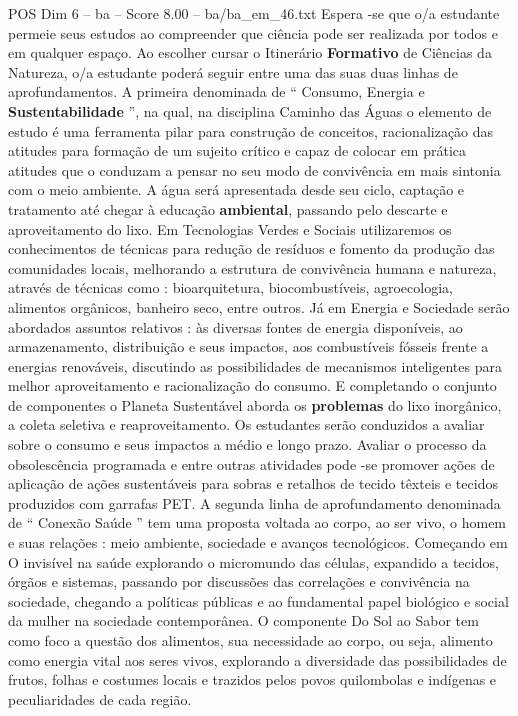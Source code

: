 \begin{textsample}{POS Dim 6 – ba – Score 8.00 – ba/ba\_em\_46.txt}
Espera -se que o/a estudante permeie seus estudos ao compreender que ciência pode ser realizada por todos e em qualquer espaço.
Ao escolher cursar o Itinerário \textbf{Formativo} de Ciências da Natureza, o/a estudante poderá seguir entre uma das suas duas linhas de aprofundamentos.
A primeira denominada de “ Consumo, Energia e \textbf{Sustentabilidade} ”, na qual, na disciplina Caminho das Águas o elemento de estudo é uma ferramenta pilar para construção de conceitos, racionalização das atitudes para formação de um sujeito crítico e capaz de colocar em prática atitudes que o conduzam a pensar no seu modo de convivência em mais sintonia com o meio ambiente.
A água será apresentada desde seu ciclo, captação e tratamento até chegar à educação \textbf{ambiental}, passando pelo descarte e aproveitamento do lixo.
Em Tecnologias Verdes e Sociais utilizaremos os conhecimentos de técnicas para redução de resíduos e fomento da produção das comunidades locais, melhorando a estrutura de convivência humana e natureza, através de técnicas como : bioarquitetura, biocombustíveis, agroecologia, alimentos orgânicos, banheiro seco, entre outros.
Já em Energia e Sociedade serão abordados assuntos relativos : às diversas fontes de energia disponíveis, ao armazenamento, distribuição e seus impactos, aos combustíveis fósseis frente a energias renováveis, discutindo as possibilidades de mecanismos inteligentes para melhor aproveitamento e racionalização do consumo.
E completando o conjunto de componentes o Planeta Sustentável aborda os \textbf{problemas} do lixo inorgânico, a coleta seletiva e reaproveitamento.
Os estudantes serão conduzidos a avaliar sobre o consumo e seus impactos a médio e longo prazo.
Avaliar o processo da obsolescência programada e entre outras atividades pode -se promover ações de aplicação de ações sustentáveis para sobras e retalhos de tecido têxteis e tecidos produzidos com garrafas PET.
A segunda linha de aprofundamento denominada de “ Conexão Saúde ” tem uma proposta voltada ao corpo, ao ser vivo, o homem e suas relações : meio ambiente, sociedade e avanços tecnológicos.
Começando em O invisível na saúde explorando o micromundo das células, expandido a tecidos, órgãos e sistemas, passando por discussões das correlações e convivência na sociedade, chegando a políticas públicas e ao fundamental papel biológico e social da mulher na sociedade contemporânea.
O componente Do Sol ao Sabor tem como foco a questão dos alimentos, sua necessidade ao corpo, ou seja, alimento como energia vital aos seres vivos, explorando a diversidade das possibilidades de frutos, folhas e costumes locais e trazidos pelos povos quilombolas e indígenas e peculiaridades de cada região.

\end{textsample}

